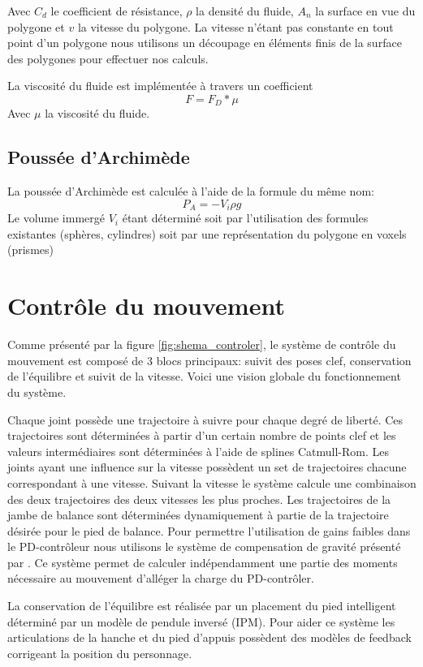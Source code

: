 \documentclass{llncs}
\begin{document}
Avec \(C_d\) le coefficient de résistance, \(\rho\) la densité du fluide, \(A_n\) la surface en vue du polygone et \(v\) la vitesse du polygone. La vitesse n'étant pas constante en tout point d'un polygone nous utilisons un découpage en éléments finis de la surface des polygones pour effectuer nos calculs.

La viscosité du fluide est implémentée à travers un coefficient 
\[
F=F_D*\mu
\]
Avec \(\mu\) la viscosité du fluide.
%
\subsection{Poussée d'Archimède}
%
La poussée d'Archimède est calculée à l'aide de la formule du même nom:
\[
P_A=-V_i \rho g
\]
Le volume immergé \(V_i\) étant déterminé soit par l'utilisation des formules existantes (sphères, cylindres) soit par une représentation du polygone en voxels (prismes)
%
\section{Contrôle du mouvement}
%
Comme présenté par la figure \ref{fig:shema_controler}, le système de contrôle du mouvement est composé de 3 blocs principaux: suivit des poses clef, conservation de l'équilibre et suivit de la vitesse. Voici une vision globale du fonctionnement du système.

Chaque joint possède une trajectoire à suivre pour chaque degré de liberté. Ces trajectoires sont déterminées à partir d'un certain nombre de points clef et les valeurs intermédiaires sont déterminées à l'aide de splines Catmull-Rom. Les joints ayant une influence sur la vitesse possèdent un set de trajectoires chacune correspondant à une vitesse. Suivant la vitesse le système calcule une combinaison des deux trajectoires des deux vitesses les plus proches. Les trajectoires de la jambe de balance sont déterminées dynamiquement à partie de la trajectoire désirée pour le pied de balance.
Pour permettre l'utilisation de gains faibles dans le PD-contrôleur nous utilisons le système de compensation de gravité présenté par \cite{coros2010generalized}. Ce système permet de calculer indépendamment une partie des moments nécessaire au mouvement d'alléger la charge du PD-contrôler.

La conservation de l'équilibre est réalisée par un placement du pied intelligent déterminé par un modèle de pendule inversé (IPM). Pour aider ce système les articulations de la hanche et du pied d'appuis possèdent des modèles de feedback corrigeant la position du personnage.
\end{document}
